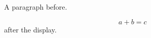 \documentclass[10pt]{article}
\begin{document}
A paragraph before.

\[ a + b = c \]
after the display.
\end{document}
